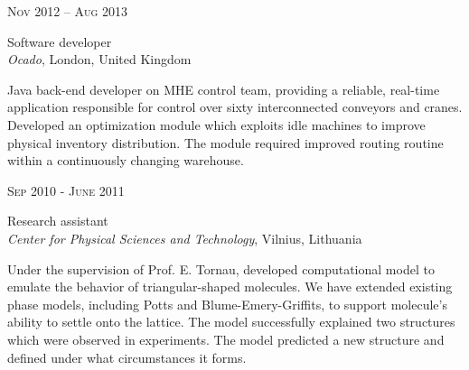 \documentclass[10pt]{article} %
\begin{document}
{\begin{minipage}[t]{0.5\textwidth}

{\raggedleft\textsc{Nov 2012 – Aug 2013}\par}

{\raggedright\large Software developer\\
\textit{Ocado}, London, United Kingdom\\[5pt]}

\normalsize{Java back-end developer on MHE control team,
providing a reliable, real-time application responsible for
control over sixty interconnected conveyors and cranes.
Developed an optimization module which exploits idle machines
to improve physical inventory distribution.
The module required improved routing routine within a continuously changing warehouse.}\\


\vspace{0.5cm}
{\raggedleft\textsc{Sep 2010 - June 2011}\par}

{\raggedright\large Research assistant\\
\textit{Center for Physical Sciences and Technology}, Vilnius, Lithuania\\[5pt]}

\normalsize{Under the supervision of Prof. E. Tornau,
 developed computational model to emulate the behavior
of triangular-shaped molecules. We have extended existing
phase models, including Potts and Blume-Emery-Griffits,
to support molecule's ability to settle onto the lattice.
The model successfully explained two structures which were observed in experiments.
The model predicted a new structure and defined under what circumstances it forms.}\\


\end{minipage} %
\hfill
\begin{minipage}[t]{0.44\textwidth} %
\vspace{0pt} %



\end{minipage}}
\end{document}
